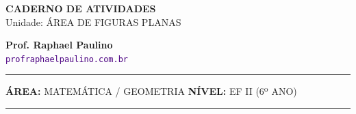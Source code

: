 \documentclass[twoside, 10pt, a4paper]{article}
\begin{document}
\thispagestyle{empty}
\color{Cinzablack}
\vspace*{-1.8cm}

\noindent
\begin{minipage}{\textwidth}
    \selectfont
    \noindent
    \begin{minipage}[t]{0.70\linewidth}
        {\Large \bfseries \MakeUppercase{Caderno de Atividades}}\\[0.1cm]
        {\large \textmd{\textcolor{CinzaEscuro}{Unidade: ÁREA DE FIGURAS PLANAS}}}
    \end{minipage}%
    \begin{minipage}[t]{0.30\linewidth}
        \raggedleft
        \small \textbf{Prof. Raphael Paulino}\\
        \textsf{\small \textcolor{indigo}{\texttt{profraphaelpaulino.com.br}}}
    \end{minipage}
    
    \vspace{0.15cm}
    \noindent\rule{\linewidth}{1.2pt}
    \vspace{-0.1cm}
    \footnotesize\textsf{\textbf{ÁREA:} MATEMÁTICA / GEOMETRIA \hfill \textbf{NÍVEL:} EF II (6º ANO)}
    \vspace{0.1cm}
    \noindent\rule{\linewidth}{0.4pt}
\end{minipage}
\end{document}
